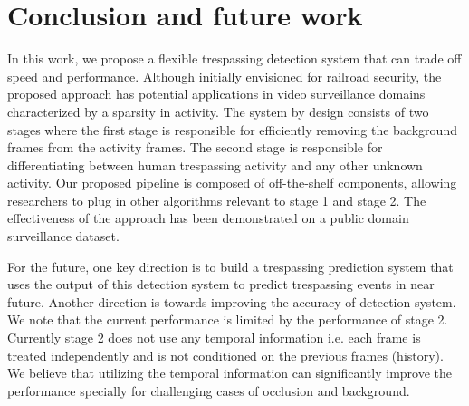 \section{Conclusion and future work}
\label{sec:conclusion}
In this work, we propose a flexible trespassing detection system that can trade off speed and performance. Although initially envisioned for railroad security, the proposed approach has potential applications in video surveillance domains characterized by a sparsity in activity.  The system by design consists of two stages where the first stage is responsible for efficiently removing the background frames from the activity frames. The second stage is responsible for differentiating between human trespassing activity and any other unknown activity. Our proposed pipeline is composed of off-the-shelf components, allowing researchers to plug in other algorithms relevant to stage 1 and stage 2. The effectiveness of the approach has been demonstrated on a public domain surveillance dataset. 

For the future, one key direction is to build a trespassing prediction system that uses the output of this detection system to predict trespassing events in near future. Another direction is towards improving the accuracy of detection system. We note that the current performance is limited by the performance of stage 2. Currently stage 2 does not use any temporal information i.e. each frame is treated independently and is not conditioned on the previous frames (history). We believe that utilizing the temporal information can significantly improve the performance specially for challenging cases of occlusion and background.